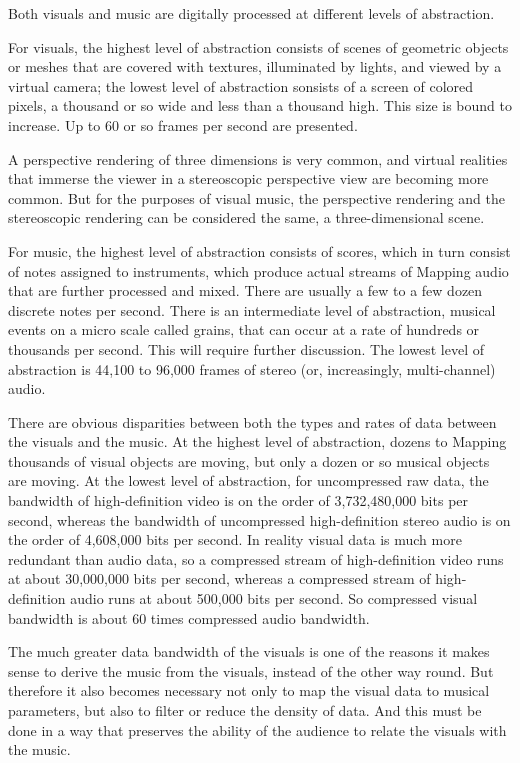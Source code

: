 \documentclass[english,11pt,letterpaper,onecolumn]{scrartcl}
\begin{document}
Both visuals and music are digitally processed at different levels of 
abstraction. 

For visuals, the highest level of abstraction consists of scenes 
of geometric objects or meshes that are covered with textures, illuminated by 
lights, and viewed by a virtual camera; the lowest level of abstraction 
sonsists of a screen of colored pixels, a thousand or so 
wide and less than a thousand high. This size is bound to increase. Up to 60 
or so frames per second are presented. 

A perspective rendering of three 
dimensions is very common, and virtual realities that immerse the viewer in a 
stereoscopic perspective view are becoming more common. But for the purposes 
of visual music, the perspective rendering and the stereoscopic rendering can 
be considered the same, a three-dimensional scene.

For music, the highest level of abstraction consists of scores, which in turn 
consist of notes assigned to instruments, which produce actual streams of 
Mapping audio that are further processed and mixed. There are usually a few to 
a few dozen discrete notes per second. There is an intermediate level of 
abstraction, musical events on a micro scale called grains, that can occur 
at a rate of hundreds or thousands per second. This will require further 
discussion. The lowest level of abstraction is 44,100 to 
96,000 frames of stereo (or, increasingly, multi-channel) audio.

There are obvious disparities between both the types and rates of data between 
the visuals and the music. At the highest level of abstraction, dozens to 
Mapping thousands of visual objects are moving, but only a dozen or so musical 
objects are moving. At the lowest level of abstraction, for uncompressed raw 
data, the bandwidth of high-definition video is on the order of 3,732,480,000 
bits per second, whereas the bandwidth of uncompressed high-definition stereo 
audio is on the order of 4,608,000 bits per second. In reality visual data is 
much more redundant than audio data, so a compressed stream of high-definition 
video runs at about 30,000,000 bits per second, whereas a compressed stream of 
high-definition audio runs at about 500,000 bits per second. So 
compressed visual bandwidth is about 60 times compressed audio 
bandwidth.

The much greater data bandwidth of the visuals is one of 
the reasons it makes sense to derive the music from the visuals, instead of 
the other way round. But therefore it also becomes necessary not only to map 
the visual data to musical parameters, but also to filter or reduce the density 
of data. And this must be done in a way that preserves the ability of the 
audience to relate the visuals with the music.
\end{document}
